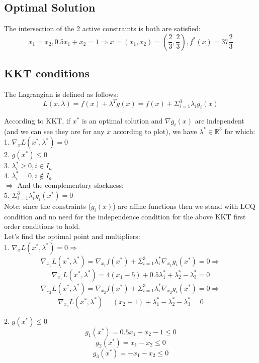 \documentclass[12pt]{article}
\begin{document}
\subsection{Optimal Solution}

The intersection of the 2 active constraints is both are satisfied:
$$x_1=x_2, 0.5x_1+x_2=1 \Rightarrow x=(x_1,x_2)=(\frac{2}{3},\frac{2}{3}), f^*(x) = 37\frac{2}{3}$$

\subsection{KKT conditions}

The Lagrangian is defined as follows:
$$L(x,\lambda)=f(x) + \lambda^Tg(x) = f(x) + \Sigma_{i=1}^3\lambda_ig_i(x)$$

According to KKT, if $x^*$ is an optimal solution and $\nabla g_i(x)$ are independent (and we can see they are for any $x$ according to plot), we have $\lambda^* \in \mathbb{R}^3$ for which:\\
1. $\nabla_x L(x^*,\lambda^*) = 0$\\
2. $g(x^*)\leq0$\\
3. $\lambda_i^* \geq 0, i \in I_a$\\
4. $\lambda_i^* = 0, i \notin I_a$\\
$\Rightarrow$ And the complementary slackness:\\
5. $\Sigma_{i=1}^3\lambda_i^*g_i(x^*) = 0$\\

Note: since the constraints ($g_i(x)$) are affine functions then we stand with LCQ condition and no need for the independence condition for the above KKT first order conditions to hold.\\

Let's find the optimal point and multipliers:\\

1. $\nabla_x L(x^*,\lambda^*) = 0 \Rightarrow$\\
$$\nabla_{x_1} L(x^*,\lambda^*) = \nabla_{x_1} f(x^*) + \Sigma_{i=1}^3\lambda^*_i\nabla_{x_1} g_i(x^*) = 0\Rightarrow$$
$$\nabla_x_1 L(x^*,\lambda^*) = 4(x_1-5) + 0.5\lambda^*_1 + \lambda^*_2 -\lambda^*_3 = 0$$
$$\nabla_x_2 L(x^*,\lambda^*) = \nabla_{x_2} f(x^*) + \Sigma_{i=1}^3\lambda^*_i\nabla_{x_2} g_i(x^*) = 0\Rightarrow$$
$$\nabla_{x_2} L(x^*,\lambda^*) = (x_2-1) + \lambda^*_1 - \lambda^*_2 -\lambda^*_3 = 0$$

2. $g(x^*)\leq0$\\
$$ g_1(x^*) = 0.5x_1 +x_2 -1 \leq 0$$
$$ g_2(x^*) = x_1 -x_2 \leq 0$$
$$ g_3(x^*) = -x_1 -x_2 \leq 0$$
\end{document}
